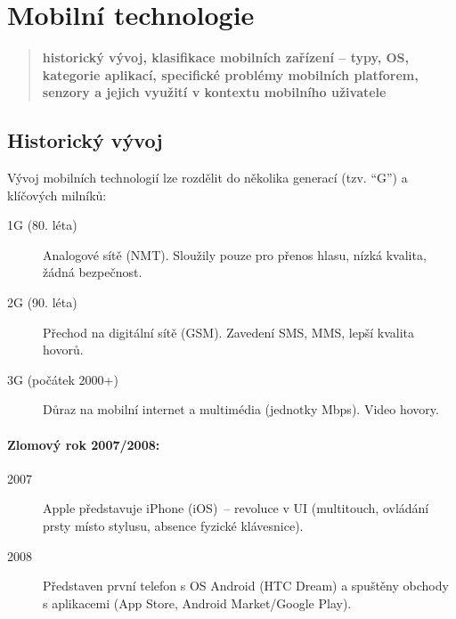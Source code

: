 
\section{Mobilní technologie}
\begin{quote}
\textbf{historický vývoj, klasifikace mobilních zařízení – typy, OS, kategorie aplikací, specifické problémy mobilních platforem, senzory a jejich využití v kontextu mobilního uživatele} 
\end{quote}

\subsection{Historický vývoj}

Vývoj mobilních technologií lze rozdělit do několika generací (tzv. ``G'') a klíčových milníků:

\begin{description}
    \item[1G (80. léta)] Analogové sítě (NMT). Sloužily pouze pro přenos hlasu, nízká kvalita, žádná bezpečnost.
    
    \item[2G (90. léta)] Přechod na digitální sítě (GSM). Zavedení SMS, MMS, lepší kvalita hovorů.
    
    \item[3G (počátek 2000+)] Důraz na mobilní internet a multimédia (jednotky Mbps). Video hovory.
\end{description}

\paragraph{Zlomový rok 2007/2008:}

\begin{description}
    \item[2007] Apple představuje iPhone (iOS)~-- revoluce v UI (multitouch, ovládání prsty místo stylusu, absence fyzické klávesnice).
    
    \item[2008] Představen první telefon s OS Android (HTC Dream) a spuštěny obchody s aplikacemi (App Store, Android Market/Google Play).
\end{description}

